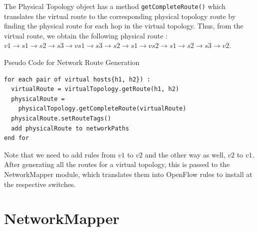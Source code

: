 The Physical Topology object has a method \verb|getCompleteRoute()| which translates the virtual route to the corresponding physical topology route by finding the physical route for each hop in the virtual topology. Thus, from the virtual route, we obtain the following physical route : $v1 \rightarrow s1 \rightarrow s2 \rightarrow s3  \rightarrow vs1 \rightarrow s3 \rightarrow s2  \rightarrow s1 \rightarrow vs2 \rightarrow s1  \rightarrow s2 \rightarrow s3 \rightarrow v2$. \\
\begin{center}
	Pseudo Code for Network Route Generation
\end{center}
\begin{lstlisting}
for each pair of virtual hosts{h1, h2}) : 
  virtualRoute = virtualTopology.getRoute(h1, h2)
  physicalRoute = 
    physicalTopology.getCompleteRoute(virtualRoute)
  physicalRoute.setRouteTags()
  add physicalRoute to networkPaths
end for
\end{lstlisting}
Note that we need to add rules from $v1$ to $v2$ and the other way as well, $v2$ to $v1$. After generating all the routes for a virtual topology, this is passed to the NetworkMapper module, which translates them into OpenFlow rules to install at the respective switches. 

\section{NetworkMapper}
